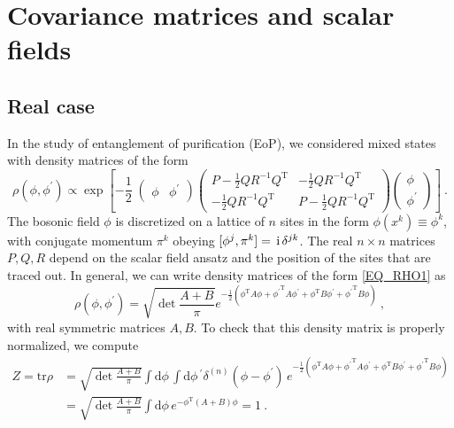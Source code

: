 \documentclass[letter]{article}
\renewcommand{\i}{\,\ensuremath\mathrm{i\,}}
\newcommand{\tr}{\mathrm{tr}}
\newcommand{\intd}[1]{\int\mathrm{d}#1\,}
\begin{document}
\section*{Covariance matrices and scalar fields}
\subsection*{Real case}

In the study of entanglement of purification (EoP), we considered mixed states with density matrices of the form
\begin{equation}
\label{EQ_RHO1}
\rho(\phi, \phi^\prime) \propto \exp\left[ 
-\frac{1}{2}\;
\begin{pmatrix}
\phi &
\phi^\prime
\end{pmatrix}
\begin{pmatrix}
P - \frac{1}{2}Q R^{-1} Q^\mathrm{T} & - \frac{1}{2}Q R^{-1} Q^\mathrm{T}\\
- \frac{1}{2}Q R^{-1} Q^\mathrm{T} & P - \frac{1}{2}Q R^{-1} Q^\mathrm{T}
\end{pmatrix}
\begin{pmatrix}
\phi \\
\phi^\prime
\end{pmatrix}
 \right]\ .
\end{equation}
The bosonic field $\phi$ is discretized on a lattice of $n$ sites in the form $\phi(x^k) \equiv \phi^k$, with conjugate momentum $\pi^k$ obeying $[\phi^j,\pi^k] = \i\delta^{j k}$. The real $n\times n$ matrices $P,Q,R$ depend on the scalar field ansatz and the position of the sites that are traced out.
In general, we can write density matrices of the form \eqref{EQ_RHO1} as
\begin{equation}
\label{EQ_RHO2}
\rho(\phi, \phi^\prime) = \sqrt{\det\frac{A+B}{\pi}} e^{-\frac{1}{2} (\phi^\mathrm{T} A \phi + {\phi^\prime}^\mathrm{T} A \phi^\prime + \phi^\mathrm{T} B \phi^\prime  + {\phi^\prime}^\mathrm{T} B \phi) }\ ,
\end{equation}
with real symmetric matrices $A,B$. To check that this density matrix is properly normalized, we compute
\begin{align}
Z = \tr{\rho} &=  \sqrt{\det\frac{A+B}{\pi}} \intd\phi \intd\phi^\prime  \delta^{(n)}(\phi - \phi^\prime)\, e^{ -\frac{1}{2} (\phi^\mathrm{T} A \phi + {\phi^\prime}^\mathrm{T} A \phi^\prime + \phi^\mathrm{T} B \phi^\prime + {\phi^\prime}^\mathrm{T} B \phi ) } \nonumber\\
&= \sqrt{\det\frac{A+B}{\pi}} \intd\phi e^{ -\phi^\mathrm{T} (A+B) \phi} 
= 1\ .
\end{align}
\end{document}
